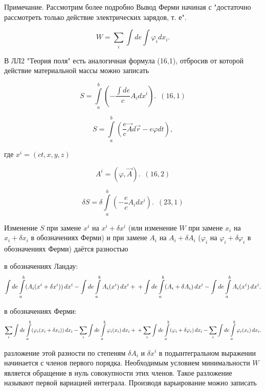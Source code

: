 \documentclass[11pt]{article}
\makeatletter
\newcommand{\boxspacing}{\kern\kvtcb@left@rule\kern\kvtcb@boxsep}
\newcommand{\prompt}[4]{
        {\ttfamily\llap{{\color{#2}[#3]:\hspace{3pt}#4}}\vspace{-\baselineskip}}
    }
\makeatother
\begin{document}
    \begin{tcolorbox}[breakable, size=fbox, boxrule=1pt, pad at break*=1mm,colback=cellbackground, colframe=cellborder]
\prompt{In}{incolor}{ }{\boxspacing}
\begin{Verbatim}[commandchars=\\\{\}]

\end{Verbatim}
\end{tcolorbox}

    Примечание. Рассмотрим более подробно Вывод Ферми начиная с "достаточно
рассмотреть только действие электрических зарядов, т. е".

\[W=\sum_i\int de \int \varphi_i dx_i.\]

    В ЛЛ2 "Теория поля" есть аналогичная формула (16,1), отбросив от которой
действие материальной массы можно записать

\[S = \int\limits_{a}^{b} \left(-\frac{\int de}{c}A_i d x^i\right).\,\,\,  (16,1)\]

\[S = \int\limits_{a}^{b} \left(\frac{e}{c}\vec A d\vec r - e \varphi dt \right),\]

где \(x^i = \left(ct, x, y, z\right)\)

\[A^i=\left(\varphi, \vec A\right).\,\,\, (16,2)\]

    \[\delta S = \delta \int\limits_{a}^{b} \left(-\frac{e}{c}A_i d x^i\right).\,\,\,  (23,1)\]

    Изменение \(S\) при замене \(x^i\) на \(x^i + \delta x^i\) (или
изменение \(W\) при замене \(x_i\) на \(x_i + \delta x_i\) в
обозначениях Ферми) и при замене \(A_i\) на \(A_i + \delta A_i\)
(\(\varphi_i\) на \(\varphi_i + \delta \varphi_i\) в обозначениях Ферми)
даётся разностью

в обозначениях Ландау: \[
\int de \int\limits_{a}^{b} (A_i(x^i + \delta x^i)) \, dx^i - \int de \int\limits_{a}^{b} A_i(x^i) \, dx^i
+\\+
\int de \int\limits_{a}^{b} (A_i + \delta A_i) \, dx^i - \int de \int\limits_{a}^{b} A_i(x^i) \, dx^i
.
\]

в обозначениях Ферми: \[
\sum_i\int de \int\limits_{a}^{b} (\varphi_i(x_i + \delta x_i)) \, dx_i - \sum_i\int de \int\limits_{a}^{b} \varphi_i(x_i) \, dx_i
+\\+
\sum_i\int de \int\limits_{a}^{b} (\varphi_i + \delta \varphi_i) \, dx_i - \sum_i\int de \int\limits_{a}^{b} \varphi_i(x_i) \, dx_i
.
\]

разложение этой разности по степеням \(\delta A_i\) и \(\delta x^i\) в
подынтегральном выражении начинается с членов первого порядка.
Необходимым условием минимальности \(W\) является обращение в нуль
совокупности этих членов. Такое разложение называют первой вариацией
интеграла. Производя варьирование можно записать
\end{document}
